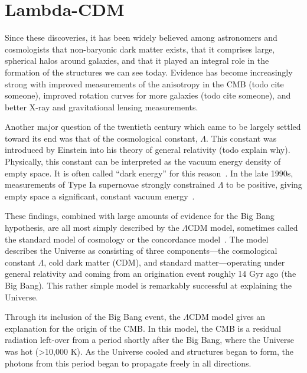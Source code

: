 \hypertarget{lambda-cdm-1}{%
\section{Lambda-CDM}\label{lambda-cdm-1}}

Since these discoveries, it has been widely believed among astronomers and
cosmologists that non-baryonic dark matter exists, that it comprises large,
spherical halos around galaxies, and that it played an integral role in the
formation of the structures we can see today. Evidence has become increasingly
strong with improved measurements of the anisotropy in the CMB (todo cite
someone), improved rotation curves for more galaxies (todo cite someone), and
better X-ray and gravitational lensing measurements.

Another major question of the twentieth century which came to be largely
settled toward its end was that of the cosmological constant, \(\Lambda\).
This constant was introduced by Einstein into his theory of general relativity
(todo explain why). Physically, this constant can be interpreted as the vacuum
energy density of empty space. It is often called ``dark energy'' for this
reason~\cite{schneider_extragalactic_2015}. In the late 1990s, measurements of
Type Ia supernovae strongly constrained \(\Lambda\) to be positive, giving
empty space a significant, constant vacuum
energy~\cite{riess_observational_1998,perlmutter_measurements_1999}.

These findings, combined with large amounts of evidence for the Big Bang
hypothesis, are all most simply described by the \(\Lambda\)CDM model,
sometimes called the standard model of cosmology or the concordance model~\cite{dodelson_modern_2021}. The model describes the Universe as consisting
of three components---the cosmological constant \(\Lambda\), cold dark matter
(CDM), and standard matter---operating under general relativity and coming
from an origination event roughly 14 Gyr ago (the Big Bang). This rather
simple model is remarkably successful at explaining the Universe.

Through its inclusion of the Big Bang event, the \(\Lambda\)CDM model gives an
explanation for the origin of the CMB. In this model, the CMB is a residual
radiation left-over from a period shortly after the Big Bang, where the
Universe was hot (\textgreater{}10,000 K). As the Universe cooled and
structures began to form, the photons from this period began to propagate
freely in all directions.

